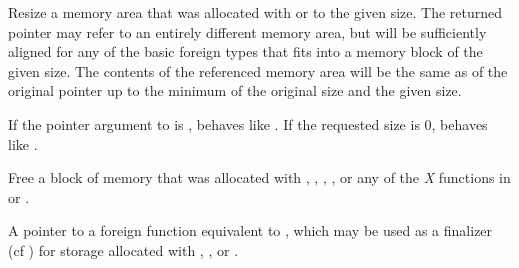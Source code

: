 \begin{haddockdesc}
\item[\begin{tabular}{@{}l}
reallocBytes :: Ptr a -> Int -> IO (Ptr a)
\end{tabular}]
{\haddockbegindoc
Resize a memory area that was allocated with  or 
 to the given size.  The returned pointer may refer to an entirely
 different memory area, but will be sufficiently aligned for any of the
 basic foreign types that fits into a memory block of the given size.
 The contents of the referenced memory area will be the same as of
 the original pointer up to the minimum of the original size and the
 given size.\par
If the pointer argument to  is , 
 behaves like .  If the requested size is 0, 
 behaves like .\par}
\end{haddockdesc}
\begin{haddockdesc}
\item[\begin{tabular}{@{}l}
free :: Ptr a -> IO ()
\end{tabular}]
{\haddockbegindoc
Free a block of memory that was allocated with ,
 , , , 
 or any of the \emph{X} functions in  or
 .\par}
\end{haddockdesc}
\begin{haddockdesc}
\item[\begin{tabular}{@{}l}
finalizerFree :: FinalizerPtr a
\end{tabular}]
{\haddockbegindoc
A pointer to a foreign function equivalent to , which may be
 used as a finalizer (cf ) for storage
 allocated with , ,  or .\par}
\end{haddockdesc}